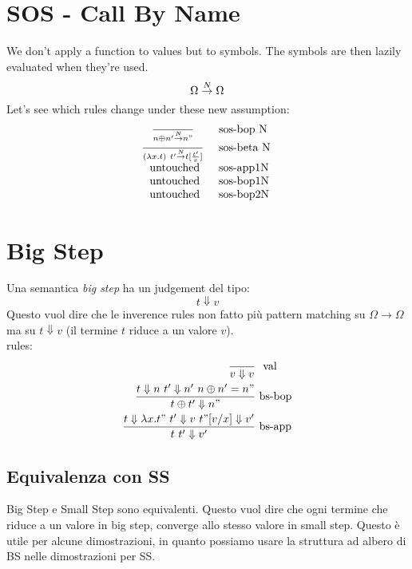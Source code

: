 \documentclass{article}
\begin{document}
\section{SOS - Call By Name}
We don't apply a function to values but to symbols. The symbols are then lazily evaluated when they're used.
\[
    \Omega\overset{N}{\rightarrow}\Omega
\]
Let's see which rules change under these new assumption:
$$\begin{array}{c l}
    \frac{}{n\oplus n' \overset{N}{\rightarrow} n"}\ &\text{sos-bop N} \\
    \frac{}{(\lambda x.t)\ t'\overset{N}{\rightarrow} t[\frac {t'} x]}\   &\text{sos-beta N} \\
    \text{untouched}                                 &\text{sos-app1N } \\
    \text{untouched}                                 &\text{sos-bop1N } \\
    \text{untouched}                                 &\text{sos-bop2N } \\
\end{array}$$

\section{Big Step}
Una semantica \textit{big step} ha un judgement del tipo:
\[
    t\Downarrow v
\]
Questo vuol dire che le inverence rules non fatto più pattern matching su $\Omega\to\Omega$ ma su $t\Downarrow v$ (il termine $t$ riduce a un valore $v$). \\
rules:
\begin{align*}
    \frac{}{v\Downarrow v}\ &\text{ val} \\
    \frac{t\Downarrow n\ t'\Downarrow n'\ n\oplus n'=n"}{t\oplus t' \Downarrow n"}\ &\text{bs-bop} \\
    \frac{t\Downarrow \lambda x.t"\ t'\Downarrow v\ t"[v/x]\Downarrow v'}{t\ t'\Downarrow v'}\ &\text{bs-app} \\
\end{align*}

\subsection{Equivalenza con SS}
Big Step e Small Step sono equivalenti. Questo vuol dire che ogni termine che riduce a un valore in big step, converge allo stesso valore in small step. 
Questo è utile per alcune dimostrazioni, in quanto possiamo usare la struttura ad albero di BS nelle dimostrazioni per SS.
\end{document}
